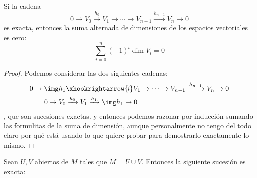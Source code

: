 \documentclass[palatino, bibnumbers]{apuntes}
\begin{document}
\begin{prop} Si la cadena \[ 0 \to V_0 \xrightarrow{h_0} V_1 \to \dotsb \to V_{n-1} \xrightarrow{h_{n-1}} V_{n} \to 0 \] es exacta, entonces la suma alternada de dimensiones de los espacios vectoriales es cero:  \[ \sum_{i=0}^n (-1)^i \dim V_i = 0\]
\end{prop}

\begin{proof} Podemos considerar las dos siguientes cadenas: \begin{align*}
0 \to \img h_1 & \xhookrightarrow{i} V_1 \to \dotsb \to V_{n-1} \xrightarrow{h_{n-1}} V_{n} \to 0 \\
0 \to V_0 &\xrightarrow{h_0} V_1 \xrightarrow{h_1} \img h_1 \to 0
\end{align*}, que son sucesiones exactas, y entonces podemos razonar por inducción sumando las formulitas de la suma de dimensión, aunque personalmente no tengo del todo claro por qué está usando lo que quiere probar para demostrarlo exactamente lo mismo.
\end{proof}

\begin{theorem} \label{thm:SucesionMayerVietoris} Sean $U,V$ abiertos de $M$ tales que $M = U ∪ V$. Entonces la siguiente sucesión es exacta:

\begin{center}
\tikzexternaldisable
{}
\tikzexternalenable
\end{center}
\end{theorem}
\end{document}
